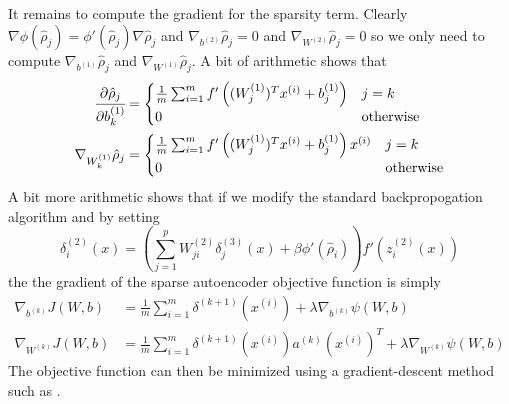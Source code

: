 \documentclass[twocolumn]{article}
\newcommand{\Wo}{W^{(1)}}
\newcommand{\Wt}{W^{(2)}}
\newcommand{\bo}{b^{(1)}}
\newcommand{\bt}{b^{(2)}}
\newcommand{\zt}{z^{(2)}}
\newcommand{\dr}{\delta^{(3)}}
\newcommand{\dt}{\delta^{(2)}}
\newcommand{\xii}{x^{(i)}}
\newcommand{\pd}[2]{\ensuremath{\cfrac{\partial #1}{\partial #2}}}
\begin{document}
It remains to compute the gradient for the sparsity term.
Clearly $\nabla\phi(\hat\rho_j)=\phi'(\hat\rho_j)\nabla\hat\rho_j$ and $\nabla_{\bt}\hat\rho_j=0$ and
$\nabla_{\Wt}\hat\rho_j=0$ so we only need to compute $\nabla_{\bo}\hat\rho_j$ and $\nabla_{\Wo}\hat\rho_j$.
A bit of arithmetic shows that
\begin{align*}
  \pd{\hat\rho_j}{\bo_k} &= \begin{cases} 
      \frac1m\sum_{i=1}^mf'\left((\Wo_j)^T\xii+\bo_j\right) & j=k \\
      0 & \textrm{otherwise}
  \end{cases} \\
    \nabla_{\Wo_k}\hat\rho_j &= \begin{cases}
      \frac1m\sum_{i=1}^mf'\left((\Wo_j)^T\xii+\bo_j\right)\xii & j=k \\
      0 & \textrm{otherwise}
    \end{cases}
\end{align*}
A bit more arithmetic shows that if we modify the standard backpropogation algorithm and by setting
\[\dt_i(x) = \left(\sum_{j=1}^p\Wt_{ji}\dr_j(x)+\beta\phi'(\hat\rho_i)\right)f'\left(\zt_i(x)\right)\]
the the gradient of the sparse autoencoder objective function is simply
\begin{align*}
  \nabla_{b^{(k)}}J(W,b) &= \frac1m\sum_{i=1}^m\delta^{(k+1)}(\xii) + \lambda\nabla_{b^{(k)}}\psi(W,b) \\
  \nabla_{W^{(k)}}J(W,b) &= \frac1m\sum_{i=1}^m\delta^{(k+1)}(\xii)a^{(k)}(\xii)^T
    + \lambda\nabla_{W^{(k)}}\psi(W,b)
\end{align*}
The objective function can then be minimized using a gradient-descent method such as \cite{liu1989limited}.



\end{document}
